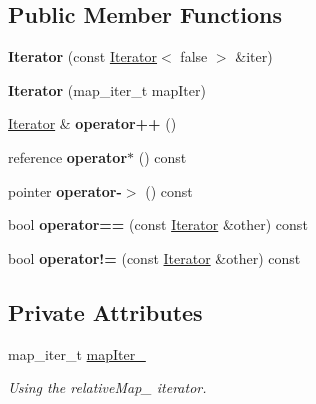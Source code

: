 \subsection*{Public Member Functions}
\begin{DoxyCompactItemize}
\item 
\mbox{\label{class_graph_1_1_iterator_a5cc156a05e14f0c12fd70250190549a8}} 
{\bfseries Iterator} (const \hyperlink{class_graph_1_1_iterator}{Iterator}$<$ false $>$ \&iter)
\item 
\mbox{\label{class_graph_1_1_iterator_a2025b23bebf0a52abbccbf464169c430}} 
{\bfseries Iterator} (map\+\_\+iter\+\_\+t map\+Iter)
\item 
\mbox{\label{class_graph_1_1_iterator_aef59b534be35fb1ae2e57b96ed6b006e}} 
\hyperlink{class_graph_1_1_iterator}{Iterator} \& {\bfseries operator++} ()
\item 
\mbox{\label{class_graph_1_1_iterator_aa96d72d3f86e22ba1a3348f9488610d9}} 
reference {\bfseries operator$\ast$} () const
\item 
\mbox{\label{class_graph_1_1_iterator_a09fb44e0720597e1f2ee86481b74fc9f}} 
pointer {\bfseries operator-\/$>$} () const
\item 
\mbox{\label{class_graph_1_1_iterator_a1ef9b8aff2321b88182ec26962ae4acb}} 
bool {\bfseries operator==} (const \hyperlink{class_graph_1_1_iterator}{Iterator} \&other) const
\item 
\mbox{\label{class_graph_1_1_iterator_a43abc5076e80163c192e8f19a546f2d3}} 
bool {\bfseries operator!=} (const \hyperlink{class_graph_1_1_iterator}{Iterator} \&other) const
\end{DoxyCompactItemize}
\subsection*{Private Attributes}
\begin{DoxyCompactItemize}
\item 
\mbox{\label{class_graph_1_1_iterator_aff313e9a22e70df0fde1102f0911e6d1}} 
map\+\_\+iter\+\_\+t \hyperlink{class_graph_1_1_iterator_aff313e9a22e70df0fde1102f0911e6d1}{map\+Iter\+\_\+}
\begin{DoxyCompactList}\small\item\em Using the relative\+Map\+\_\+ iterator. \end{DoxyCompactList}\end{DoxyCompactItemize}
